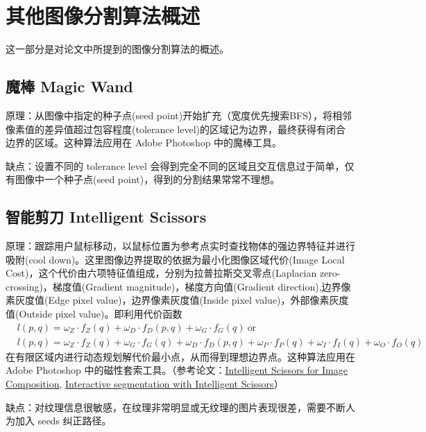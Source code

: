\documentclass[lang=cn,11pt,a4paper]{elegantpaper}
\begin{document}
\section{其他图像分割算法概述}

这一部分是对论文中所提到的图像分割算法的概述。

\subsection{魔棒 Magic Wand}

原理：从图像中指定的种子点(seed point)开始扩充（宽度优先搜索BFS），将相邻像素值的差异值超过包容程度(tolerance level)的区域记为边界，最终获得有闭合边界的区域。这种算法应用在 Adobe Photoshop 中的魔棒工具。

缺点：设置不同的 tolerance level 会得到完全不同的区域且交互信息过于简单，仅有图像中一个种子点(seed point)，得到的分割结果常常不理想。

\subsection{智能剪刀 Intelligent Scissors}

原理：跟踪用户鼠标移动，以鼠标位置为参考点实时查找物体的强边界特征并进行吸附(cool down)。这里图像边界提取的依据为最小化图像区域代价(Image  Local Cost)，这个代价由六项特征值组成，分别为拉普拉斯交叉零点(Laplacian zero-crossing)，梯度值(Gradient magnitude)，梯度方向值(Gradient direction),边界像素灰度值(Edge pixel value)，边界像素灰度值(Inside pixel value)，外部像素灰度值(Outside pixel value)。即利用代价函数
\begin{equation}
    \begin{aligned}
        &l(p, q)=\omega_{Z} \cdot f_{Z}(q) +\omega_{D} \cdot f_{D}(p, q) +\omega_{G} \cdot f_{G}(q) \ \text{or} \\
        &l(p, q)=\omega_{Z} \cdot f_{Z}(q)+\omega_{G} \cdot f_{G}(q)+\omega_{D} \cdot f_{D}(p, q)+\omega_{P} \cdot f_{P}(q)+\omega_{I} \cdot f_{I}(q)+\omega_{O} \cdot f_{O}(q)
    \end{aligned}
\end{equation}
在有限区域内进行动态规划解代价最小点，从而得到理想边界点。这种算法应用在 Adobe Photoshop 中的磁性套索工具。（参考论文：\href{https://dl.acm.org/doi/pdf/10.1145/218380.218442}{Intelligent Scissors for Image Composition}, \href{https://www.sciencedirect.com/science/article/pii/S1077316998904804}{Interactive segmentation with Intelligent Scissors}）

缺点：对纹理信息很敏感，在纹理非常明显或无纹理的图片表现很差，需要不断人为加入 seeds 纠正路径。
\end{document}
